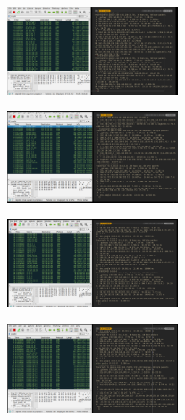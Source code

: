 \documentclass{assignment}
\begin{document}
\begin{itemize}
\begin{figure}[h]
\begin{center}
      \end{center}
      \label{fig:}
    \end{figure}
    \begin{figure}[h]
      \begin{center}
        \includegraphics[width=0.45\textwidth]{1004.png}
      \end{center}
      \label{fig:}
    \end{figure}
    \begin{figure}[h]
      \begin{center}
        \includegraphics[width=0.45\textwidth]{1005.png}
      \end{center}
      \label{fig:}
    \end{figure}
    \newpage
    \begin{figure}[h]
      \begin{center}
        \includegraphics[width=0.45\textwidth]{1006.png}
      \end{center}
      \label{fig:}
    \end{figure}
    \begin{figure}[h]
      \begin{center}
        \includegraphics[width=0.45\textwidth]{1007.png}

\end{center}
\end{figure}
\end{itemize}
\end{document}
